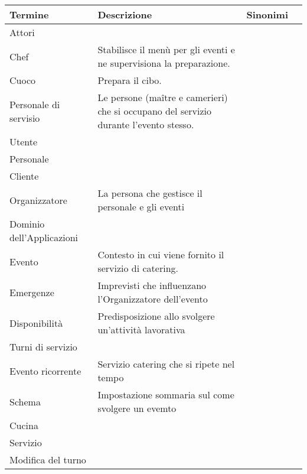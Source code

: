 \begin{center}
  \begin{tabular}{|p{3cm}|p{3cm}|p{3cm}|p{3cm}|}
    \hline
    Termine &Descrizione & Sinonimi  \\
    \hline
    Attori\\
    \hline
    Chef & Stabilisce il menù per gli eventi e ne supervisiona la preparazione. & \\  
    \hline
    Cuoco &Prepara il cibo. &\\
    \hline
    Personale di servisio & Le persone (maître e camerieri) che si occupano del servizio durante l'evento stesso. &\\
    \hline
    Utente &\\
    \hline
    Personale &\\ 
    \hline
    Cliente &\\
    \hline
    Organizzatore & La persona che gestisce il personale e gli eventi & \\
    \hline
    
    Dominio dell'Applicazioni\\ 
    \hline
    Evento & Contesto in cui viene fornito il servizio di catering. & \\
    \hline
    Emergenze &Imprevisti che influenzano l'Organizzatore dell'evento & \\
    \hline
    Disponibilità& Predisposizione allo svolgere un'attività lavorativa & \\
    \hline 
    Turni di servizio & &\\
    \hline 
    \hline
    Evento ricorrente & Servizio catering che si ripete nel tempo &\\
    \hline
    Schema &Impostazione sommaria sul come svolgere un evemto \\
    \hline
    Cucina & & \\
    \hline
    Servizio & &\\
    \hline
    Modifica del turno &  &\\
    \hline
  \end{tabular}
\end{center}